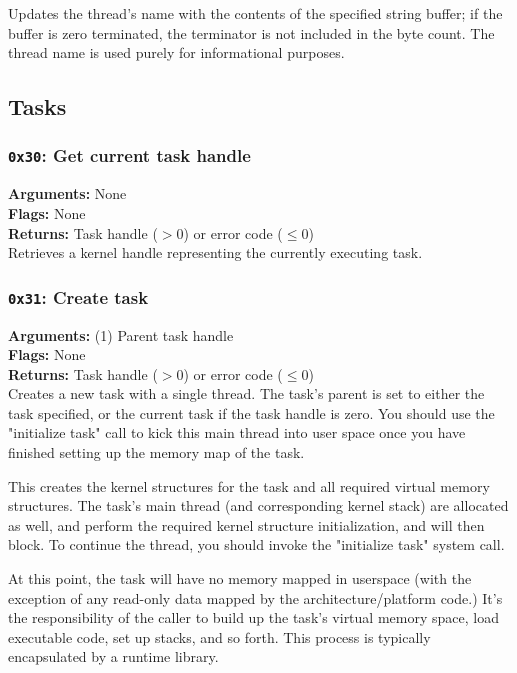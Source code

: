 \documentclass[11pt]{article}
\begin{document}
Updates the thread's name with the contents of the specified string buffer; if the buffer is zero terminated, the terminator is not included in the byte count. The thread name is used purely for informational purposes. 


\newpage
\subsection{Tasks}
\subsubsection{{\tt 0x30}: Get current task handle}
\textbf{Arguments:} None \\
\textbf{Flags:} None \\
\textbf{Returns:} Task handle ($>0$) or error code ($\leq0$) \\

Retrieves a kernel handle representing the currently executing task.

\subsubsection{{\tt 0x31}: Create task}
\textbf{Arguments:} (1) Parent task handle \\
\textbf{Flags:} None \\
\textbf{Returns:} Task handle ($>0$) or error code ($\leq0$) \\

Creates a new task with a single thread. The task's parent is set to either the task specified, or the current task if the task handle is zero. You should use the "initialize task" call to kick this main thread into user space once you have finished setting up the memory map of the task.

This creates the kernel structures for the task and all required virtual memory structures. The task's main thread (and corresponding kernel stack) are allocated as well, and perform the required kernel structure initialization, and will then block. To continue the thread, you should invoke the "initialize task" system call.

At this point, the task will have no memory mapped in userspace (with the exception of any read-only data mapped by the architecture/platform code.) It's the responsibility of the caller to build up the task's virtual memory space, load executable code, set up stacks, and so forth. This process is typically encapsulated by a runtime library.
\end{document}
